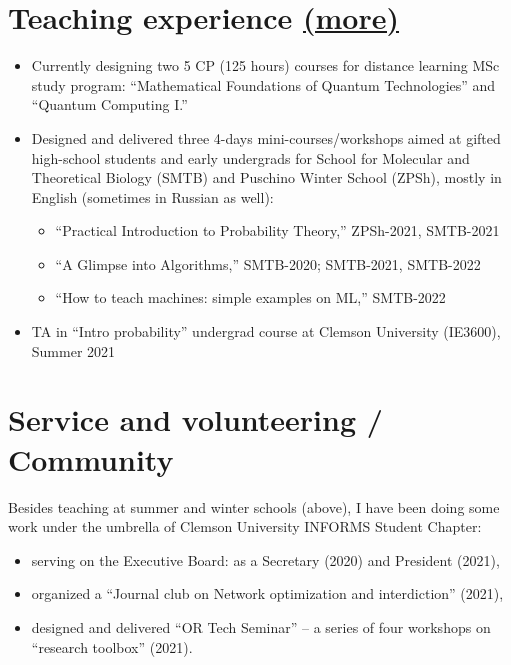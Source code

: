 \documentclass[11pt, a4paper]{article} \usepackage{geometry} %
\newcommand{\mhref}[1]{\hfill\href{#1}{\small (more\faExternalLink*)}}
\begin{document}
   \section*{Teaching experience \mhref{https://www.bochkarev.io/teaching/}}
   \begin{itemize}
     \itemsep0pt
     \item Currently designing two 5 CP (125 hours) courses for distance
           learning MSc study program: ``Mathematical Foundations of Quantum
           Technologies'' and ``Quantum Computing I.''
      \item Designed and delivered three 4-days mini-courses/workshops aimed at gifted
      high-school students and early undergrads for School for Molecular and
      Theoretical Biology (SMTB) and Puschino Winter School (ZPSh), mostly in English
      (sometimes in Russian as well):
      \begin{itemize}
        \itemsep0pt
        \item ``Practical Introduction to Probability Theory,'' ZPSh-2021,
          SMTB-2021
        \item ``A Glimpse into Algorithms,'' SMTB-2020; SMTB-2021, SMTB-2022
        \item ``How to teach machines: simple examples on ML,'' SMTB-2022
      \end{itemize}
      \item TA in ``Intro probability'' undergrad course at Clemson University
        (IE3600), Summer 2021
\end{itemize}
   \section*{Service and volunteering / Community}
   Besides teaching at summer and winter schools (above), I have been doing some work under the umbrella of Clemson University INFORMS Student Chapter:
   \begin{itemize}
     \itemsep0pt
   \item serving on the Executive Board: as a Secretary (2020) and President
     (2021),
   \item organized a ``Journal club on Network optimization and interdiction''
     (2021),
   \item designed and delivered ``OR Tech Seminar'' -- a series of four
     workshops on ``research toolbox'' (2021).
   \end{itemize}
   \vspace{0.3em}
\end{document}
